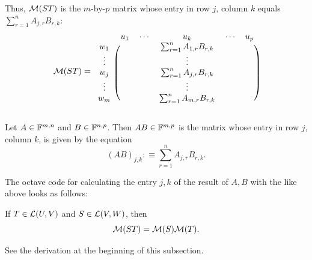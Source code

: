 \begin{minipage}{\linewidth-40pt}
  Thus, $\mathcal{M}(ST)$ is the $m$-by-$p$ matrix whose entry in row $j$, column $k$ equals
  $\sum_{r=1}^{n} A_{j,r}  B_{r,k}$:
\begin{equation}
  \mathcal{M} (ST) =
  \begin{blockarray}{cccccc}
             & u_1 & \cdots &  u_k      & \cdots & u_p \\
    \begin{block}{c(ccccc)}
      w_1    &     &        &
        \sum_{r=1}^{n} A_{1,r}  B_{r,k} &        &     \\
      \vdots &     &        &  \vdots   &        &     \\
      w_j    &     &        &
        \sum_{r=1}^{n} A_{j,r}  B_{r,k} &        &     \\
      \vdots &     &        &  \vdots   &        &     \\
      w_m    &     &        &
        \sum_{r=1}^{n} A_{m,r}  B_{r,k} &        &     \\
    \end{block}
  \end{blockarray}
\end{equation}
\end{minipage}


\setcounter{thm}{40}
\begin{mydef} 
  \label{def: matrix multiplication}
  Let $A \in \mathbb{F}^{m,n}$ and $B \in \mathbb{F}^{n,p}$. Then $AB \in \mathbb{F}^{m,p}$ is the matrix whose entry in row $j$, column $k$, is given by the equation
  \begin{equation}
    (AB)_{j,k} :\equiv \sum_{r=1}^{n} A_{j,r} B_{r,k}.
  \end{equation} %


    The octave code for calculating the entry $j,k$ of the result of $A, B$ with the  like above looks as follows:


\end{mydef}

\setcounter{thm}{42}
\begin{thm}
  \label{thm: matrix of product of linear maps1}
  If $T \in \mathcal{L}(U,V)$ and $S\in \mathcal{L}(V,W)$, then
  \begin{equation}
    \mathcal{M}(ST) = \mathcal{M}(S) \mathcal{M}(T).
  \end{equation}
\end{thm}
\begin{prf}
  See the derivation at the beginning of this subsection.
\end{prf}


